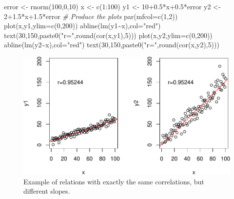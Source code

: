 \documentclass[
]{book}
\newenvironment{Shaded}{\begin{snugshade}}{\end{snugshade}}
\newcommand{\AttributeTok}[1]{\textcolor[rgb]{0.77,0.63,0.00}{#1}}
\newcommand{\CommentTok}[1]{\textcolor[rgb]{0.56,0.35,0.01}{\textit{#1}}}
\newcommand{\DecValTok}[1]{\textcolor[rgb]{0.00,0.00,0.81}{#1}}
\newcommand{\FloatTok}[1]{\textcolor[rgb]{0.00,0.00,0.81}{#1}}
\newcommand{\FunctionTok}[1]{\textcolor[rgb]{0.00,0.00,0.00}{#1}}
\newcommand{\NormalTok}[1]{#1}
\newcommand{\OtherTok}[1]{\textcolor[rgb]{0.56,0.35,0.01}{#1}}
\newcommand{\SpecialCharTok}[1]{\textcolor[rgb]{0.00,0.00,0.00}{#1}}
\newcommand{\StringTok}[1]{\textcolor[rgb]{0.31,0.60,0.02}{#1}}
\theoremstyle{definition}
\theoremstyle{definition}
\theoremstyle{definition}
\theoremstyle{definition}
\theoremstyle{remark}
\begin{document}
\begin{Shaded}
\begin{Highlighting}[]
\NormalTok{error }\OtherTok{\textless{}{-}} \FunctionTok{rnorm}\NormalTok{(}\DecValTok{100}\NormalTok{,}\DecValTok{0}\NormalTok{,}\DecValTok{10}\NormalTok{)}
\NormalTok{x }\OtherTok{\textless{}{-}} \FunctionTok{c}\NormalTok{(}\DecValTok{1}\SpecialCharTok{:}\DecValTok{100}\NormalTok{)}
\NormalTok{y1 }\OtherTok{\textless{}{-}} \DecValTok{10}\FloatTok{+0.5}\SpecialCharTok{*}\NormalTok{x}\FloatTok{+0.5}\SpecialCharTok{*}\NormalTok{error}
\NormalTok{y2 }\OtherTok{\textless{}{-}} \DecValTok{2}\FloatTok{+1.5}\SpecialCharTok{*}\NormalTok{x}\FloatTok{+1.5}\SpecialCharTok{*}\NormalTok{error}
\CommentTok{\# Produce the plots}
\FunctionTok{par}\NormalTok{(}\AttributeTok{mfcol=}\FunctionTok{c}\NormalTok{(}\DecValTok{1}\NormalTok{,}\DecValTok{2}\NormalTok{))}
\FunctionTok{plot}\NormalTok{(x,y1,}\AttributeTok{ylim=}\FunctionTok{c}\NormalTok{(}\DecValTok{0}\NormalTok{,}\DecValTok{200}\NormalTok{))}
\FunctionTok{abline}\NormalTok{(}\FunctionTok{lm}\NormalTok{(y1}\SpecialCharTok{\textasciitilde{}}\NormalTok{x),}\AttributeTok{col=}\StringTok{"red"}\NormalTok{)}
\FunctionTok{text}\NormalTok{(}\DecValTok{30}\NormalTok{,}\DecValTok{150}\NormalTok{,}\FunctionTok{paste0}\NormalTok{(}\StringTok{"r="}\NormalTok{,}\FunctionTok{round}\NormalTok{(}\FunctionTok{cor}\NormalTok{(x,y1),}\DecValTok{5}\NormalTok{)))}
\FunctionTok{plot}\NormalTok{(x,y2,}\AttributeTok{ylim=}\FunctionTok{c}\NormalTok{(}\DecValTok{0}\NormalTok{,}\DecValTok{200}\NormalTok{))}
\FunctionTok{abline}\NormalTok{(}\FunctionTok{lm}\NormalTok{(y2}\SpecialCharTok{\textasciitilde{}}\NormalTok{x),}\AttributeTok{col=}\StringTok{"red"}\NormalTok{)}
\FunctionTok{text}\NormalTok{(}\DecValTok{30}\NormalTok{,}\DecValTok{150}\NormalTok{,}\FunctionTok{paste0}\NormalTok{(}\StringTok{"r="}\NormalTok{,}\FunctionTok{round}\NormalTok{(}\FunctionTok{cor}\NormalTok{(x,y2),}\DecValTok{5}\NormalTok{)))}
\end{Highlighting}
\end{Shaded}

\begin{figure}
\centering
\includegraphics{Svetunkov---Statistics-for-Business-Analytics_files/figure-latex/correlationsScatterplotExample-1.pdf}
\caption{\label{fig:correlationsScatterplotExample}Example of relations with exactly the same correlations, but different slopes.}
\end{figure}
\end{document}
